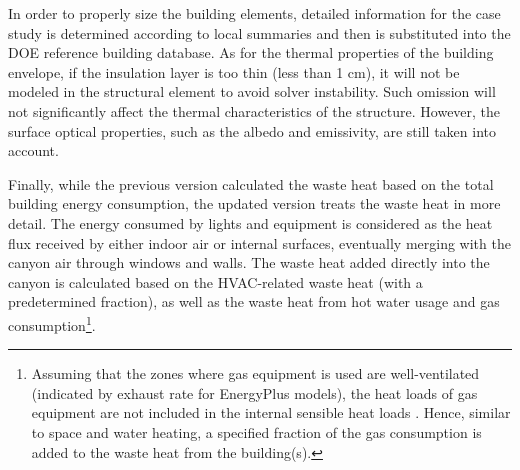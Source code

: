 In order to properly size the building elements, detailed information for the case study is determined according to local summaries and then is substituted into the DOE reference building database. As for the thermal properties of the building envelope, if the insulation layer is too thin (less than 1 cm), it will not be modeled in the structural element to avoid solver instability. Such omission will not significantly affect the thermal characteristics of the structure. However, the surface optical properties, such as the albedo and emissivity, are still taken into account.

Finally, while the previous version calculated the waste heat based on the total building energy consumption, the updated version treats the waste heat in more detail. The energy consumed by lights and equipment is considered as the heat flux received by either indoor air or internal surfaces, eventually merging with the canyon air through windows and walls. The waste heat added directly into the canyon is calculated based on the HVAC-related waste heat (with a predetermined fraction), as well as the waste heat from hot water usage and gas consumption\footnote{Assuming that the zones where gas equipment is used are well-ventilated (indicated by exhaust rate for EnergyPlus models), the heat loads of gas equipment are not included in the internal sensible heat loads \cite{yang2016curious}. Hence, similar to space and water heating, a specified fraction of the gas consumption is added to the waste heat from the building(s).}.

